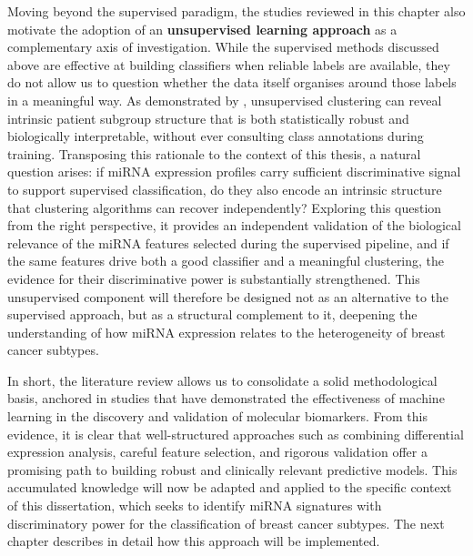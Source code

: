 Moving beyond the supervised paradigm, the studies reviewed in this chapter also motivate
the adoption of an \textbf{unsupervised learning approach} as a complementary axis of
investigation. While the supervised methods discussed above are effective at building
classifiers when reliable labels are available, they do not allow us to question whether
the data itself organises around those labels in a meaningful way. As demonstrated by
\textcite{ferro2021phenomapping}, unsupervised clustering can reveal intrinsic patient
subgroup structure that is both statistically robust and biologically interpretable,
without ever consulting class annotations during training. Transposing this rationale
to the context of this thesis, a natural question arises: if miRNA expression
profiles carry sufficient discriminative signal to support supervised classification,
do they also encode an intrinsic structure that clustering algorithms can recover
independently? Exploring this question from the right perspective, it provides an
independent validation of the biological relevance of the miRNA features selected
during the supervised pipeline, and if the same features drive both a good classifier
and a meaningful clustering, the evidence for their discriminative power is substantially
strengthened. This unsupervised component will therefore
be designed not as an alternative to the supervised approach, but as a structural
complement to it, deepening the understanding of how miRNA expression relates to the
heterogeneity of breast cancer subtypes.

In short, the literature review allows us to consolidate a solid methodological
basis, anchored in studies that have demonstrated the effectiveness of machine
learning in the discovery and validation of molecular biomarkers. From this
evidence, it is clear that well-structured approaches such as combining
differential expression analysis, careful feature selection, and rigorous
validation offer a promising path to building robust and clinically relevant
predictive models. This accumulated knowledge will now be adapted and applied
to the specific context of this dissertation, which seeks to identify miRNA
signatures with discriminatory power for the classification of breast cancer
subtypes. The next chapter describes in detail how this approach will be
implemented.